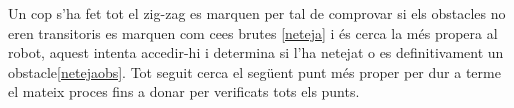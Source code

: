 Un cop s'ha fet tot el zig-zag es marquen per tal de comprovar si els obstacles no eren transitoris es marquen
com ce\lgem es brutes \ref{neteja} i és cerca la més propera al robot, aquest intenta accedir-hi i determina si l'ha netejat o es definitivament un
obstacle\ref{netejaobs}. Tot seguit cerca el següent punt més proper per dur a terme el mateix proces fins a donar per verificats tots els punts.

 